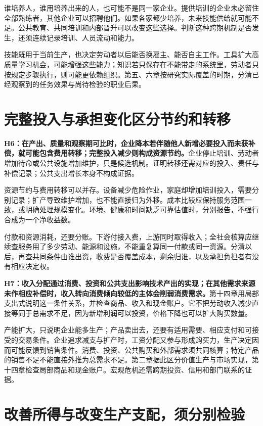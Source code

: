\documentclass[UTF8,fontset=windows,12pt,a4paper,oneside,openany]{ctexbook}
\begin{document}
谁培养人，谁用培养出来的人，也可能不是同一家企业。提供培训的企业未必留住全部熟练者，其他企业可以招聘他们。如果各家都少培养，未来技能供给就可能不足。公共教育、共同培训和内部晋升可以改变这些选择。判断这种跨期机制是否发生，还须连续记录培训、人员流动和能力。

技能既用于当前生产，也决定劳动者以后能否换雇主、能否自主工作。工具扩大高质量学习机会，可能增强这些能力；知识若只保存在不能带走的系统里，劳动者只按规定步骤执行，则可能更依赖组织。第五、六章按研究实际覆盖的时期，分清已经观察到的任务效果与尚待检验的职业后果。

\section{完整投入与承担变化区分节约和转移}

\textbf{H6：在产出、质量和观察期可比时，企业降本若伴随他人新增必要投入而未获补偿，就可能包含费用转移；完整投入减少则构成资源节约。}企业停止培训、劳动者增加待命或公共设施增加维护，只是候选机制。证明转移还需对应的投入、责任与补偿记录；公共支出增长本身不构成证据。

资源节约与费用转移可以并存。设备减少危险作业，家庭却增加培训投入，需要分别记录；扩产导致维护增加，也不能直接归为外移。成本比较应保持服务范围一致，或明确处理规模变化。环境、健康和时间缺乏可靠估值时，分别报告，不强行合成为一个净收益数。

付款和资源消耗，还要分账。下游付接入费，上游同时取得收入；全社会核算应继续查服务用了多少劳动、能源和设施，不能重复算同一付款或同一资源。分清以后，再查共同条件由谁出资，收费是否覆盖成本，剩余归谁，以及承担负担者有没有相应决定权。

\textbf{H7：收入分配通过消费、投资和公共支出影响技术产出的实现；在其他需求来源未作相应补偿时，收入转向消费倾向较低的主体会削弱消费需求。}第十四章用局部支出式说明这一条件关系，并检查商品、收入和现金账户。它不把劳动收入减少直接等同于总需求不足，因为新增利润可以投资，价格下降也可以扩大购买数量。

产能扩大，只说明企业能多生产；产品卖出去，还要有适用需要、相应支付和可接受的交易条件。企业追求减支与扩产时，工资分配又参与形成购买力，生产决定因而可能反馈到销售条件。消费、投资、公共购买和外部需求须共同核算；特定产品的销售不足不能直接外推为总需求不足。第二章据此区分价值生产与市场实现，第十四章检查局部商品和现金账户。宏观危机还需跨期投资、信用和部门联系的证据。

\section{改善所得与改变生产支配，须分别检验}
\end{document}

